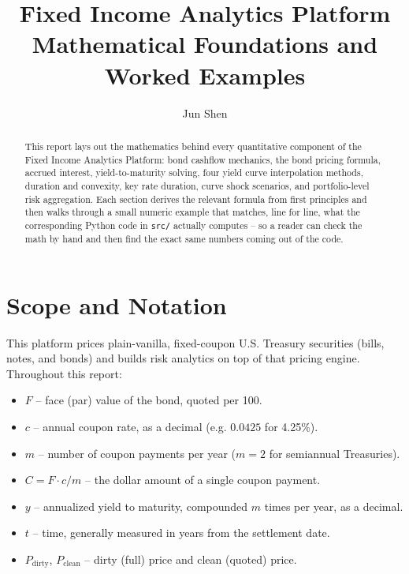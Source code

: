 \documentclass[11pt]{article}
\title{Fixed Income Analytics Platform \\ \large Mathematical Foundations and Worked Examples}
\author{Jun Shen}
\date{}
\begin{document}
\maketitle

\begin{abstract}
\noindent This report lays out the mathematics behind every quantitative component of the
Fixed Income Analytics Platform: bond cashflow mechanics, the bond pricing formula, accrued
interest, yield-to-maturity solving, four yield curve interpolation methods, duration and
convexity, key rate duration, curve shock scenarios, and portfolio-level risk aggregation.
Each section derives the relevant formula from first principles and then walks through a
small numeric example that matches, line for line, what the corresponding Python code in
\texttt{src/} actually computes -- so a reader can check the math by hand and then find the
exact same numbers coming out of the code.
\end{abstract}

\tableofcontents

\section{Scope and Notation}

This platform prices plain-vanilla, fixed-coupon U.S. Treasury securities (bills, notes, and
bonds) and builds risk analytics on top of that pricing engine. Throughout this report:

\begin{itemize}
  \item $F$ -- face (par) value of the bond, quoted per 100.
  \item $c$ -- annual coupon rate, as a decimal (e.g. $0.0425$ for 4.25\%).
  \item $m$ -- number of coupon payments per year ($m=2$ for semiannual Treasuries).
  \item $C = F \cdot c / m$ -- the dollar amount of a single coupon payment.
  \item $y$ -- annualized yield to maturity, compounded $m$ times per year, as a decimal.
  \item $t$ -- time, generally measured in years from the settlement date.
  \item $P_{\text{dirty}}$, $P_{\text{clean}}$ -- dirty (full) price and clean (quoted) price.
\end{itemize}
\end{document}
